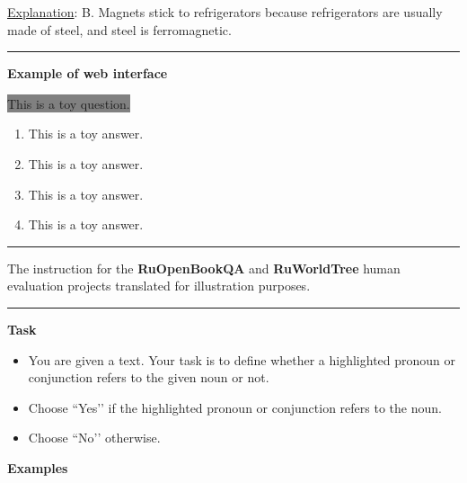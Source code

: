 \documentclass[11pt]{article}
\begin{document}
\begin{table*}[pt!]
\begin{minipage}[t]{.43\linewidth}
\begin{enumerate}[topsep=0.1pt,noitemsep]
\noindent \underline{Explanation}: B. Magnets stick to refrigerators because refrigerators are usually made of steel, and steel is ferromagnetic. 
\end{enumerate}

\par\noindent\rule{\textwidth}{0.8pt}

\vspace{0.05cm}
\textbf{Example of web interface}
\vspace{0.1cm}

\colorbox{Gray}{This is a toy question.}

\begin{enumerate}[label=\Alph*,topsep=0.1pt,noitemsep]
\item This is a toy answer.
\item This is a toy answer.
\item This is a toy answer.
\item This is a toy answer.
\end{enumerate}

\par\noindent\rule{\textwidth}{1pt}

\caption{The instruction for the \textbf{RuOpenBookQA} and \textbf{RuWorldTree} human evaluation projects translated for illustration purposes.}

\label{tab:openbook_worldtree}
\end{minipage}\hspace{0.1\textwidth}\begin{minipage}[t]{.43\linewidth}


\par\noindent\rule{\textwidth}{1pt}

\vspace{.5cm}

\textbf{Task}

\vspace{0.05cm}
\begin{itemize}[noitemsep,topsep=0.1pt]
    \item You are given a text. Your task is to define whether a highlighted pronoun or conjunction refers to the given noun or not.
    \item Choose ``Yes’’ if the highlighted pronoun or conjunction refers to the noun.
    \item Choose ``No’’ otherwise.
\end{itemize}

\vspace{0.2cm}
\textbf{Examples}
\vspace{0.05cm}


\end{minipage}
\end{table*}
\end{document}
